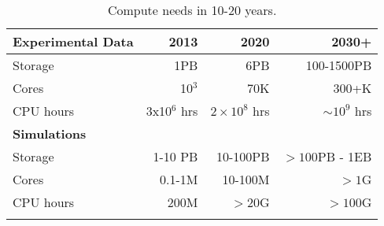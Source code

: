 \begin{center}
\begin{table}
\begin{tabular}{|l|r|r|r|} 
 \hline 
{\bf Experimental Data} & 2013 & 2020 & 2030+ \\
\hline
Storage & 1PB & 6PB & 100-1500PB \\
Cores & 10$^3$ & 70K & 300+K \\
CPU hours & 3x10$^6$ hrs & $2\times 10^8$ hrs & $\sim 10^9$ hrs \\
{\bf Simulations} &&& \\
Storage & 1-10 PB & 10-100PB & $> 100$PB - 1EB\\
Cores & 0.1-1M & 10-100M &$> 1$G\\
CPU hours & 200M & $>$20G & $> 100$G\\
\hline
\label{tab:CompNeeds}
\end{tabular}
\caption{Compute needs in 10-20 years.}
\end{table}
\end{center}

